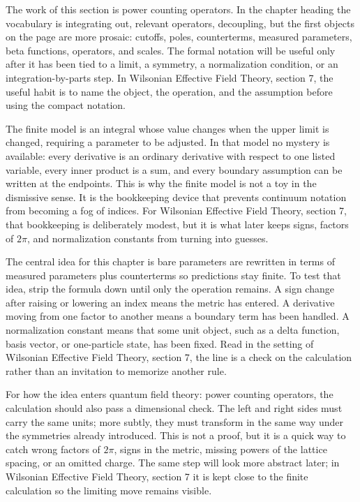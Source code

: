 The work of this section is power counting operators.  In the chapter heading the vocabulary is integrating out, relevant operators, decoupling, but the first objects on the page are more prosaic: cutoffs, poles, counterterms, measured parameters, beta functions, operators, and scales.  The formal notation will be useful only after it has been tied to a limit, a symmetry, a normalization condition, or an integration-by-parts step.  In Wilsonian Effective Field Theory, section 7, the useful habit is to name the object, the operation, and the assumption before using the compact notation.

The finite model is an integral whose value changes when the upper limit is changed, requiring a parameter to be adjusted.  In that model no mystery is available: every derivative is an ordinary derivative with respect to one listed variable, every inner product is a sum, and every boundary assumption can be written at the endpoints.  This is why the finite model is not a toy in the dismissive sense.  It is the bookkeeping device that prevents continuum notation from becoming a fog of indices.  For Wilsonian Effective Field Theory, section 7, that bookkeeping is deliberately modest, but it is what later keeps signs, factors of \(2\pi\), and normalization constants from turning into guesses.

The central idea for this chapter is bare parameters are rewritten in terms of measured parameters plus counterterms so predictions stay finite.  To test that idea, strip the formula down until only the operation remains.  A sign change after raising or lowering an index means the metric has entered.  A derivative moving from one factor to another means a boundary term has been handled.  A normalization constant means that some unit object, such as a delta function, basis vector, or one-particle state, has been fixed.  Read in the setting of Wilsonian Effective Field Theory, section 7, the line is a check on the calculation rather than an invitation to memorize another rule.

For how the idea enters quantum field theory: power counting operators, the calculation should also pass a dimensional check.  The left and right sides must carry the same units; more subtly, they must transform in the same way under the symmetries already introduced.  This is not a proof, but it is a quick way to catch wrong factors of \(2\pi\), signs in the metric, missing powers of the lattice spacing, or an omitted charge.  The same step will look more abstract later; in Wilsonian Effective Field Theory, section 7 it is kept close to the finite calculation so the limiting move remains visible.

